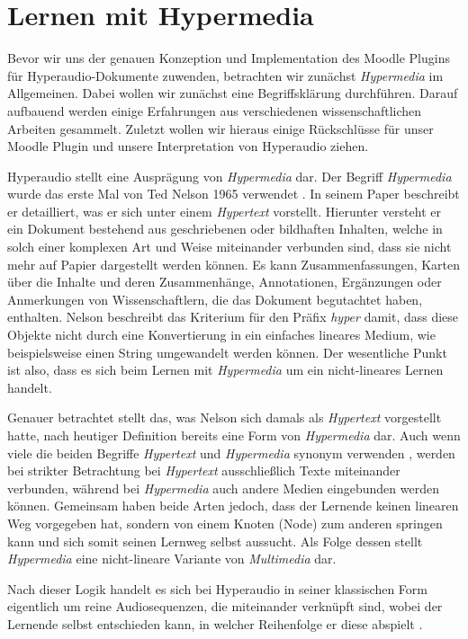 \section{Lernen mit Hypermedia}
Bevor wir uns der genauen Konzeption und Implementation des Moodle Plugins für Hyperaudio-Dokumente zuwenden, betrachten wir zunächst \textit{Hypermedia} im Allgemeinen. Dabei wollen wir zunächst eine Begriffsklärung durchführen. Darauf aufbauend werden einige Erfahrungen aus verschiedenen wissenschaftlichen Arbeiten gesammelt. Zuletzt wollen wir hieraus einige Rückschlüsse für unser Moodle Plugin und unsere Interpretation von Hyperaudio ziehen.

Hyperaudio stellt eine Ausprägung von \textit{Hypermedia} dar. Der Begriff \textit{Hypermedia} wurde das erste Mal von Ted Nelson 1965 verwendet \citep{nelson1965complex}. In seinem Paper beschreibt er detailliert, was er sich unter einem \textit{Hypertext} vorstellt. Hierunter versteht er ein Dokument bestehend aus geschriebenen oder bildhaften Inhalten, welche in solch einer komplexen Art und Weise miteinander verbunden sind, dass sie nicht mehr auf Papier dargestellt werden können. Es kann Zusammenfassungen, Karten über die Inhalte und deren Zusammenhänge, Annotationen, Ergänzungen oder Anmerkungen von Wissenschaftlern, die das Dokument begutachtet haben, enthalten. Nelson beschreibt das Kriterium für den Präfix \textit{hyper} damit, dass diese Objekte nicht durch eine Konvertierung in ein einfaches lineares Medium, wie beispielsweise einen String umgewandelt werden können. Der wesentliche Punkt ist also, dass es sich beim Lernen mit \textit{Hypermedia} um ein nicht-lineares Lernen handelt.

Genauer betrachtet stellt das, was Nelson sich damals als \textit{Hypertext} vorgestellt hatte, nach heutiger Definition bereits eine Form von \textit{Hypermedia} dar. Auch wenn viele die beiden Begriffe \textit{Hypertext} und \textit{Hypermedia} synonym verwenden \citep{nielsen2013multimedia}, werden bei strikter Betrachtung bei \textit{Hypertext} ausschließlich Texte miteinander verbunden, während bei \textit{Hypermedia} auch andere Medien eingebunden werden können. Gemeinsam haben beide Arten jedoch, dass der Lernende keinen linearen Weg vorgegeben hat, sondern von einem Knoten (Node) zum anderen springen kann und sich somit seinen Lernweg selbst aussucht. Als Folge dessen stellt \textit{Hypermedia} eine nicht-lineare Variante von \textit{Multimedia} dar.

Nach dieser Logik handelt es sich bei Hyperaudio in seiner klassischen Form eigentlich um reine Audiosequenzen, die miteinander verknüpft sind, wobei der Lernende selbst entschieden kann, in welcher Reihenfolge er diese abspielt \citep{zumbach2006learning}.

